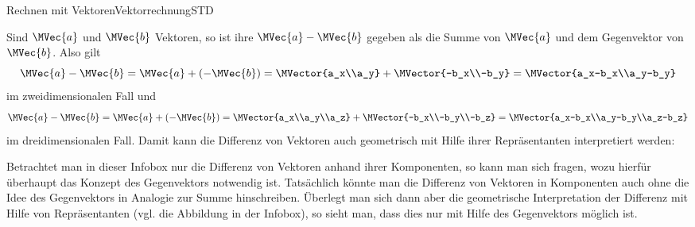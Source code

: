 \begin{MXContent}{Rechnen mit Vektoren}{Vektorrechnung}{STD}
\begin{MInfo}
Sind $\MVec{a}$ und $\MVec{b}$ Vektoren, so ist ihre  $\MVec{a}-\MVec{b}$ gegeben als die Summe von $\MVec{a}$ und dem Gegenvektor von $\MVec{b}$. Also gilt
\[
 \MVec{a}-\MVec{b}=\MVec{a}+(-\MVec{b})=\MVector{a_x\\a_y}+\MVector{-b_x\\-b_y}=\MVector{a_x-b_x\\a_y-b_y}
\]
im zweidimensionalen Fall und
\[
 \MVec{a}-\MVec{b}=\MVec{a}+(-\MVec{b})=\MVector{a_x\\a_y\\a_z}+\MVector{-b_x\\-b_y\\-b_z}=\MVector{a_x-b_x\\a_y-b_y\\a_z-b_z}
\]
im dreidimensionalen Fall. Damit kann die Differenz von Vektoren auch geometrisch mit Hilfe ihrer Repräsentanten interpretiert werden:
\begin{center}
% 
\end{center}
\end{MInfo}

Betrachtet man in dieser Infobox nur die Differenz von Vektoren anhand ihrer Komponenten, so kann man sich fragen, wozu hierfür überhaupt das Konzept des Gegenvektors notwendig ist. Tatsächlich könnte man die Differenz von Vektoren in Komponenten auch ohne die Idee des Gegenvektors in Analogie zur Summe hinschreiben. Überlegt man sich dann aber die geometrische Interpretation der Differenz mit Hilfe von Repräsentanten (vgl. die Abbildung in der Infobox), so sieht man, dass dies nur mit Hilfe des Gegenvektors möglich ist.   


\end{MXContent}
